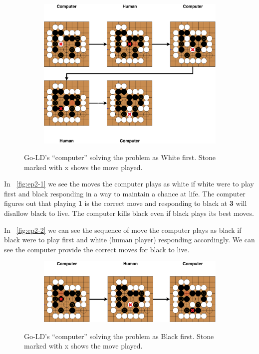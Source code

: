 \documentclass{l4proj}
\newcommand{\bo}[1]{\textbf{#1}}
\begin{document}
\begin{figure}[!ht]
\centering
\begin{subfigure}[b]{0.8\textwidth}
\includegraphics[width=\textwidth]{ep2/ep2-1.pdf}
\end{subfigure}
\caption{ Go-LD’s “computer” solving the problem as White first. Stone marked with x shows the move played.}
\label{fig:ep2-1}
\end{figure}


In ~\autoref{fig:ep2-1} we see the moves the computer plays as white if white were to play first and black responding in a way to maintain a chance at life. The computer figures out that playing \bo{1} is the correct move and responding to black at \bo{3} will disallow black to live. The computer kills black even if black plays its best moves.

In ~\autoref{fig:ep2-2} we can see the sequence of move the computer plays as black if black were to play first and white (human player) responding accordingly. We can see the computer provide the correct moves for black to live.

\begin{figure}[!ht]
\centering
\begin{subfigure}[b]{\textwidth}
\includegraphics[width=\textwidth]{ep2/ep2-2.pdf}
\end{subfigure}
\caption{ Go-LD’s “computer” solving the problem as Black first. Stone marked with x shows the move played.}
\label{fig:ep2-2}
\end{figure}
\end{document}
